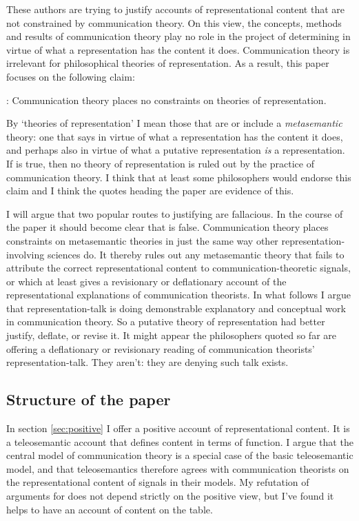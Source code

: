\documentclass[12pt]{article}
\begin{document}
These authors are trying to justify accounts of representational content that are not constrained by communication theory.
On this view, the concepts, methods and results of communication theory play no role in the project of determining in virtue of what a representation has the content it does.
Communication theory is irrelevant for philosophical theories of representation.
As a result, this paper focuses on the following claim:

\begin{myquote}
\tic{}: Communication theory places no constraints on theories of representation.
\end{myquote}

\noindent By `theories of representation' I mean those that are or include a \textit{metasemantic} theory: one that says in virtue of what a representation has the content it does, and perhaps also in virtue of what a putative representation \textit{is} a representation.
If \tic{} is true, then no theory of representation is ruled out by the practice of communication theory.
I think that at least some philosophers would endorse this claim and I think the quotes heading the paper are evidence of this.

I will argue that two popular routes to justifying \tic{} are fallacious.
In the course of the paper it should become clear that \tic{} is false.
Communication theory places constraints on metasemantic theories in just the same way other representation-involving sciences do.
It thereby rules out any metasemantic theory that fails to attribute the correct representational content to communication-theoretic signals, or which at least gives a revisionary or deflationary account of the representational explanations of communication theorists.
In what follows I argue that representation-talk is doing demonstrable explanatory and conceptual work in communication theory.
So a putative theory of representation had better justify, deflate, or revise it.
It might appear the philosophers quoted so far are offering a deflationary or revisionary reading of communication theorists' representation-talk. They aren't: they are denying such talk exists.

\subsection{Structure of the paper}

In section \ref{sec:positive} I offer a positive account of representational content.
It is a teleosemantic account that defines content in terms of function.
I argue that the central model of communication theory is a special case of the basic teleosemantic model, and that teleosemantics therefore agrees with communication theorists on the representational content of signals in their models.
My refutation of arguments for \tic{} does not depend strictly on the positive view, but I've found it helps to have an account of content on the table.
\end{document}
